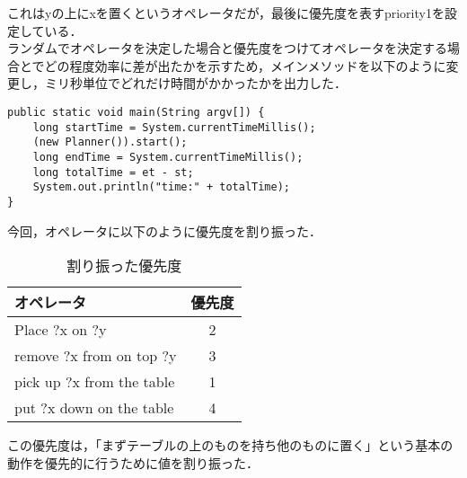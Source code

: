 \documentclass[a4j]{jarticle}
\begin{document}
これはyの上にxを置くというオペレータだが，最後に優先度を表すpriority1を設定している．\\
ランダムでオペレータを決定した場合と優先度をつけてオペレータを決定する場合とでどの程度効率に差が出たかを示すため，メインメソッドを以下のように変更し，ミリ秒単位でどれだけ時間がかかったかを出力した．\\
\begin{lstlisting}
public static void main(String argv[]) {
	long startTime = System.currentTimeMillis();
	(new Planner()).start();
	long endTime = System.currentTimeMillis();
	long totalTime = et - st;
	System.out.println("time:" + totalTime);
}
\end{lstlisting}
今回，オペレータに以下のように優先度を割り振った．\\
\begin{table}[H]
\caption{割り振った優先度}
\begin{center}
\begin{tabular}{|l|c|}
\hline
オペレータ & 優先度 \\ \hline
Place ?x on ?y & 2 \\ \hline
remove ?x from on top ?y & 3 \\ \hline
pick up ?x from the table & 1 \\ \hline
put ?x down on the table & 4 \\ \hline
\end{tabular}
\end{center}
\end{table}
この優先度は，「まずテーブルの上のものを持ち他のものに置く」という基本の動作を優先的に行うために値を割り振った．
\end{document}
